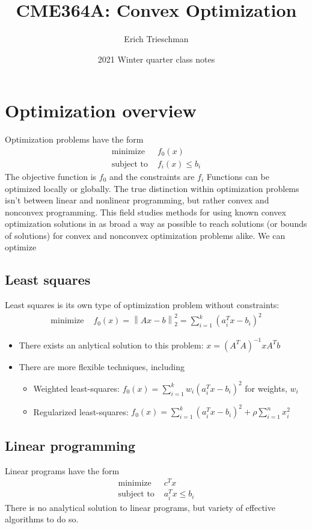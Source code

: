 \documentclass{article}
\title{CME364A: Convex Optimization}
\author{Erich Trieschman}
\date{2021 Winter quarter class notes}
\newcommand{\norm}[2]{\left\lVert#1\right\rVert_#2}
\begin{document}
\maketitle


\section{Optimization overview}
Optimization problems have the form
\begin{align*}
  \textrm{minimize   } & f_0(x)\\
  \textrm{subject to   } & f_i(x) \leq b_i 
\end{align*}
The objective function is $f_0$ and the constraints are $f_i$
Functions can be optimized locally or globally. The true distinction within optimization problems isn't between linear and nonlinear programming, but rather convex and nonconvex programming. This field studies methods for using known convex optimization solutions in as broad a way as possible to reach solutions (or bounds of solutions) for convex and nonconvex optimization problems alike. 
We can optimize

\subsection{Least squares}
Least squares is its own type of optimization problem without constraints:
\begin{align*}
   \textrm{minimize   } & f_0(x) = \norm{Ax - b}{2}^2 = \sum_{i=1}^k(a_i^Tx - b_i)^2
\end{align*}
\begin{itemize}
  \item There exists an anlytical solution to this problem: $x = (A^TA)^{-1}xA^Tb$
  \item There are more flexible techniques, including
  \begin{itemize}
    \item Weighted least-squares: $f_0(x) = \sum_{i=1}^kw_i(a_i^Tx - b_i)^2$ for weights, $w_i$
    \item Regularized least-squares: $f_0(x) = \sum_{i=1}^k(a_i^Tx - b_i)^2 + \rho \sum_{i=1}^nx_i^2$
  \end{itemize}
\end{itemize}

\subsection{Linear programming}
Linear programs have the form
\begin{align*}
  \textrm{minimize   } & c^Tx\\
  \textrm{subject to   } & a_i^Tx \leq b_i 
\end{align*}
There is no analytical solution to linear programs, but variety of effective algorithms to do so.
\end{document}
